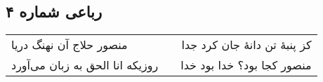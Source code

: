 \begin{center}
\section*{رباعی شماره ۴}
\label{sec:sh004}
\begin{longtable}{l p{0.5cm} r}
منصور حلاج آن نهنگ دریا
&&
کز پنبهٔ تن دانهٔ جان کرد جدا
\\
روزیکه انا الحق به زبان می‌آورد
&&
منصور کجا بود؟ خدا بود خدا
\\
\end{longtable}
\end{center}
